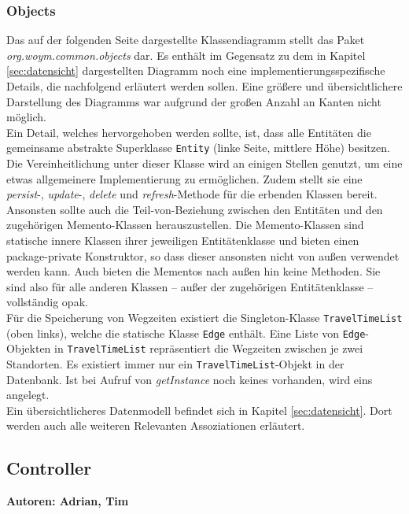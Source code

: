 \documentclass[fontsize=12pt,paper=a4,twoside]{scrartcl}
\begin{document}
\subsubsection{Objects}
\label{subsubsec:Objects}
Das auf der folgenden Seite dargestellte Klassendiagramm stellt das Paket \textit{org.woym.common.objects} dar. Es enthält im Gegensatz zu dem in Kapitel \ref{sec:datensicht} dargestellten Diagramm noch eine implementierungsspezifische Details, die nachfolgend erläutert werden sollen. Eine größere und übersichtlichere Darstellung des Diagramms war aufgrund der großen Anzahl an Kanten nicht möglich.\\
Ein Detail, welches hervorgehoben werden sollte, ist, dass alle Entitäten die gemeinsame abstrakte Superklasse \texttt{Entity} (linke Seite, mittlere Höhe) besitzen. Die Vereinheitlichung unter dieser Klasse wird an einigen Stellen genutzt, um eine etwas allgemeinere Implementierung zu ermöglichen. Zudem stellt sie eine \textit{persist}-, \textit{update}-, \textit{delete} und \textit{refresh}-Methode für die erbenden Klassen bereit.\\
Ansonsten sollte auch die Teil-von-Beziehung zwischen den Entitäten und den zugehörigen Memento-Klassen herauszustellen. Die Memento-Klassen sind statische innere Klassen ihrer jeweiligen Entitätenklasse und bieten einen package-private Konstruktor, so dass dieser ansonsten nicht von außen verwendet werden kann. Auch bieten die Mementos nach außen hin keine Methoden. Sie sind also für alle anderen Klassen -- außer der zugehörigen Entitätenklasse -- vollständig opak.\\
Für die Speicherung von Wegzeiten existiert die Singleton-Klasse \texttt{TravelTimeList} (oben links), welche die statische Klasse \texttt{Edge} enthält. Eine Liste von \texttt{Edge}-Objekten in \texttt{TravelTimeList} repräsentiert die Wegzeiten zwischen je zwei Standorten. Es existiert immer nur ein \texttt{TravelTimeList}-Objekt in der Datenbank. Ist bei Aufruf von \textit{getInstance} noch keines vorhanden, wird eins angelegt.\\
Ein übersichtlicheres Datenmodell befindet sich in Kapitel \ref{sec:datensicht}. Dort werden auch alle weiteren Relevanten Assoziationen erläutert.




\subsection{Controller}
\label{subsec:Controller}
\textbf{Autoren: Adrian, Tim}\\
\end{document}
